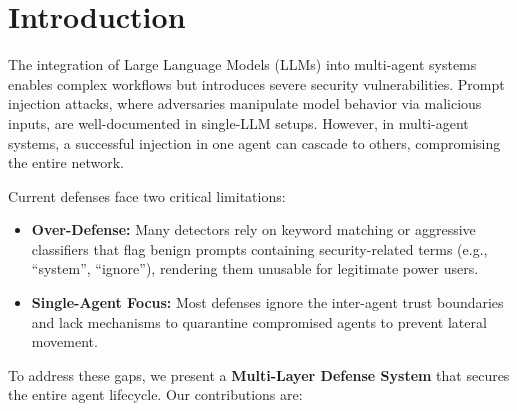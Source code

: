 \documentclass[11pt, a4paper]{article}
\begin{document}
\section{Introduction}

The integration of Large Language Models (LLMs) into multi-agent systems enables complex workflows but introduces severe security vulnerabilities. Prompt injection attacks, where adversaries manipulate model behavior via malicious inputs, are well-documented in single-LLM setups. However, in multi-agent systems, a successful injection in one agent can cascade to others, compromising the entire network.

Current defenses face two critical limitations:

\begin{itemize}
    \item \textbf{Over-Defense:} Many detectors rely on keyword matching or aggressive classifiers that flag benign prompts containing security-related terms (e.g., ``system'', ``ignore''), rendering them unusable for legitimate power users.
    \item \textbf{Single-Agent Focus:} Most defenses ignore the inter-agent trust boundaries and lack mechanisms to quarantine compromised agents to prevent lateral movement.
\end{itemize}

To address these gaps, we present a \textbf{Multi-Layer Defense System} that secures the entire agent lifecycle. Our contributions are:
\end{document}
